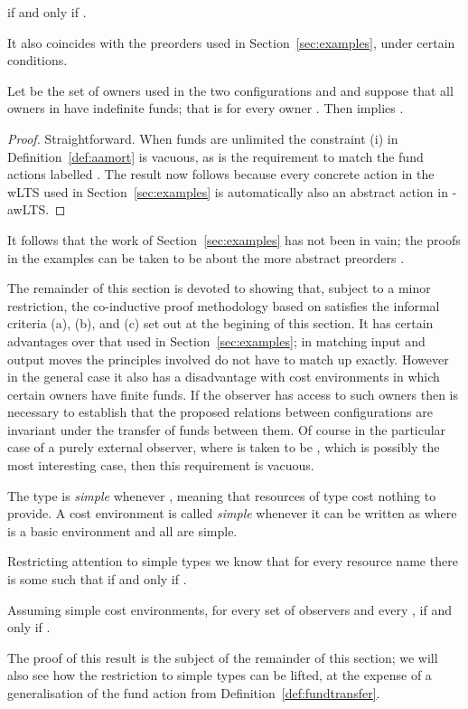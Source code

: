 \documentclass{LMCS}
\newcommand{\EndDefBox}{\null\hfill}
\newcommand{\boxHere}{\global\let\EndProof\empty\EndDefBox}
\begin{document}
if and only if  .

It  also coincides with the preorders used in Section~\ref{sec:examples}, under certain conditions. 


\begin{prop}
Let  be the set of owners used in the two configurations
 and  and suppose that  all owners in  have
  indefinite funds; that is  
for every owner . Then
   implies
. 
\end{prop}
\begin{proof}
  Straightforward.  When funds are unlimited the constraint (i) in
  Definition~\ref{def:aamort} is vacuous, as is the requirement to
  match the fund actions labelled .  The result now
  follows because every concrete action in the wLTS used in Section~\ref{sec:examples}
   is automatically also an abstract action in -awLTS.
\end{proof}
It follows  that the work of Section~\ref{sec:examples}
has not been in vain; the proofs in the examples can be taken to be 
about the more abstract  preorders . 

The remainder of this section is devoted to showing that, subject to a
minor restriction, the co-inductive proof methodology based on
 satisfies the informal criteria (a),
(b), and (c) set out at the begining of this section. It has certain
advantages over that used in Section~\ref{sec:examples}; in matching
input and output moves the principles involved do not have to match
up exactly.  However in the general case it also has a disadvantage with
cost environments in which certain owners have finite funds. If the
observer has access to such owners then is necessary to establish that
the proposed relations between configurations are invariant under the
transfer of funds between them. Of course in the particular case of a
purely external observer, where  is taken to be ,
which is possibly the most interesting case, then this requirement is
vacuous.

\begin{defi} \label{def:simpletypes}
The type  is \emph{simple} whenever , 
meaning that resources of type  cost nothing to provide. 
A cost environment is called \emph{simple} whenever it can be written as
 where  is
a basic environment and all  are simple. 

Restricting attention to simple types we know that for every resource name
  there is some  such that 
 if and only if 
.
\boxHere
\end{defi}

\begin{thm}\label{thm:fa} Assuming simple cost environments, for every 
set of observers  and 
every ,   if and only if 
  . 
\end{thm}
The proof of this result is the subject of the remainder of this section; we will
also see how the restriction to simple types can be lifted, at the expense of a
generalisation of the  fund action  from  Definition~\ref{def:fundtransfer}.
\end{document}
